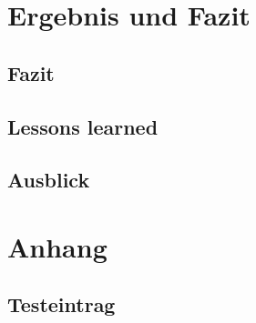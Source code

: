 \documentclass[a4paper, 12pt]{article}
\begin{document}
    \newpage
    
    \section{Ergebnis und Fazit}
    
    \subsection{Fazit}
    
    \subsection{Lessons learned}
    
    \subsection{Ausblick}

    \appendix

    \section{Anhang}
    
    \subsection{Testeintrag}
   
\end{document}
